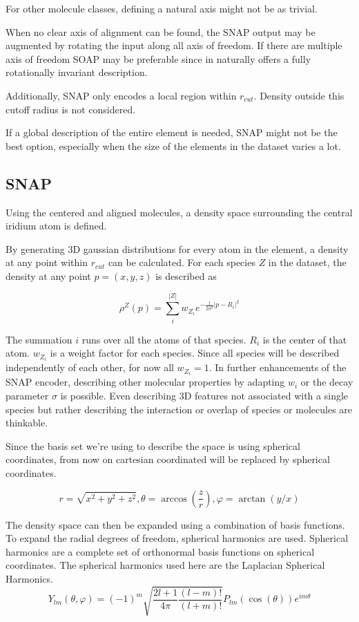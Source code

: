 For other molecule classes, defining a natural axis might not be as trivial.

When no clear axis of alignment can be found, the SNAP output may be augmented by rotating the input along all axis of freedom.
If there are multiple axis of freedom SOAP may be preferable since in naturally offers a fully rotationally invariant description.

Additionally, SNAP only encodes a local region within $r_{cut}$.
Density outside this cutoff radius is not considered.

If a global description of the entire element is needed, SNAP might not be the best option, especially when 
the size of the elements in the dataset varies a lot.

\subsection{SNAP}

Using the centered and aligned molecules, a density space surrounding the central iridium atom is defined.

By generating 3D gaussian distributions for every atom in the element, a density at any point within $r_{cut}$ can be calculated.
For each species $Z$ in the dataset, the density at any point $p = (x,y,z)$ is described as

$$\rho^Z(p) = \sum_i^{|Z|} w_{Z_i} e^{- \frac{1}{2\sigma^2} \vert p - R_i \vert^2 }$$  %

The summation $i$ runs over all the atoms of that species.
$R_i$ is the center of that atom.
$w_{Z_i}$ is a weight factor for each species. 
Since all species will be described independently of each other, for now all $w_{Z_i}=1$.
In further enhancements of the SNAP encoder, describing other molecular properties by adapting $w_{i}$ or the decay parameter $\sigma$ is possible.
Even describing 3D features not associated with a single species but rather describing the interaction or overlap of species 
or molecules are thinkable.

Since the basis set we're using to describe the space is using spherical coordinates, from now on
cartesian coordinated will be replaced by spherical coordinates.

$$
r = \sqrt{x^2 + y^2 + z^2}
,
\theta = \arccos(\frac{z}{r})
,
\varphi = \arctan(y / x)
$$ %

The density space can then be expanded using a combination of basis functions.
To expand the radial degrees of freedom, spherical harmonics are used.
Spherical harmonics are a complete set of orthonormal basis functions on spherical coordinates.
The spherical harmonics used here are the Laplacian Spherical Harmonics.
$$
Y_{lm}(\theta, \varphi) = (-1)^m \sqrt{\frac{2l + 1}{4 \pi} \frac{(l - m)!}{(l + m)!}} P_{lm}\left(\cos(\theta) \right) e^{im\theta}
$$

